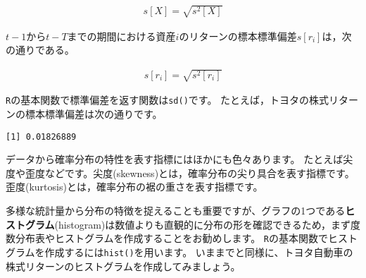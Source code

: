 \documentclass[
  letterpaper,
  pandoc,
  ja=standard,
  jafont = hiragino-pron]{ltjsbook}
\newenvironment{Shaded}{\begin{snugshade}}{\end{snugshade}}
\newcommand{\AttributeTok}[1]{\textcolor[rgb]{0.40,0.45,0.13}{#1}}
\newcommand{\ConstantTok}[1]{\textcolor[rgb]{0.56,0.35,0.01}{#1}}
\newcommand{\FunctionTok}[1]{\textcolor[rgb]{0.28,0.35,0.67}{#1}}
\newcommand{\NormalTok}[1]{\textcolor[rgb]{0.00,0.23,0.31}{#1}}
\newcommand{\SpecialCharTok}[1]{\textcolor[rgb]{0.37,0.37,0.37}{#1}}
\newcommand{\StringTok}[1]{\textcolor[rgb]{0.13,0.47,0.30}{#1}}
\begin{document}
\begin{tcolorbox}[enhanced jigsaw, colframe=quarto-callout-important-color-frame, breakable, rightrule=.15mm, coltitle=black, title=\textcolor{quarto-callout-important-color}{\faExclamation}\hspace{0.5em}{標本標準偏差}, colbacktitle=quarto-callout-important-color!10!white, leftrule=.75mm, colback=white, left=2mm, arc=.35mm, opacityback=0, titlerule=0mm, toptitle=1mm, bottomtitle=1mm, bottomrule=.15mm, toprule=.15mm, opacitybacktitle=0.6]

\[
\begin{aligned}
s [X] = \sqrt{s^2[X]}
\end{aligned}
\]

\end{tcolorbox}

\(t-1\)から\(t-T\)までの期間における資産\(i\)のリターンの標本標準偏差\(s[r_i]\)は，次の通りである。

\[
\begin{aligned}
s [r_i] = \sqrt{s^2 [r_i]}
\end{aligned}
\]

\texttt{R}の基本関数で標準偏差を返す関数は\texttt{sd()}です。
たとえば，トヨタの株式リターンの標本標準偏差は次の通りです。

\begin{Shaded}
\end{Shaded}

\begin{verbatim}
[1] 0.01826889
\end{verbatim}

データから確率分布の特性を表す指標にはほかにも色々あります。
たとえば尖度や歪度などです。尖度(skewness)とは，確率分布の尖り具合を表す指標です。
歪度(kurtosis)とは，確率分布の裾の重さを表す指標です。

多様な統計量から分布の特徴を捉えることも重要ですが、グラフの1つである\textbf{ヒストグラム}(histogram)は数値よりも直観的に分布の形を確認できるため，まず度数分布表やヒストグラムを作成することをお勧めします。
\texttt{R}の基本関数でヒストグラムを作成するには\texttt{hist()}を用います。
いままでと同様に、トヨタ自動車の株式リターンのヒストグラムを作成してみましょう。
\end{document}
